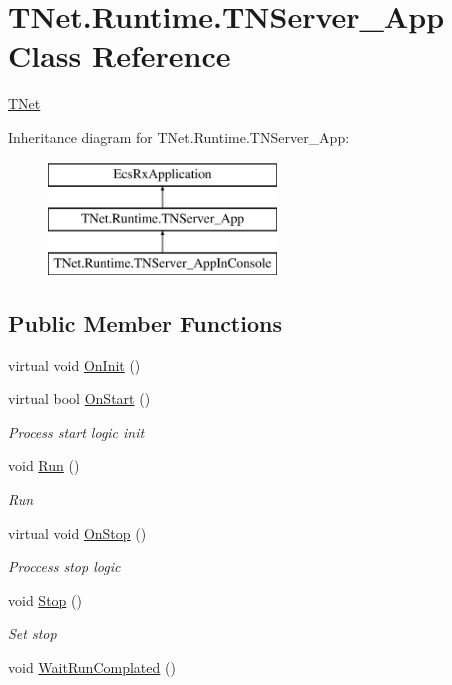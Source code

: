\hypertarget{class_t_net_1_1_runtime_1_1_t_n_server___app}{}\section{T\+Net.\+Runtime.\+T\+N\+Server\+\_\+\+App Class Reference}
\label{class_t_net_1_1_runtime_1_1_t_n_server___app}


\mbox{\hyperlink{namespace_t_net}{T\+Net}}  


Inheritance diagram for T\+Net.\+Runtime.\+T\+N\+Server\+\_\+\+App\+:\begin{figure}[H]
\begin{center}
\leavevmode
\includegraphics[height=3.000000cm]{class_t_net_1_1_runtime_1_1_t_n_server___app}
\end{center}
\end{figure}
\subsection*{Public Member Functions}
\begin{DoxyCompactItemize}
\item 
virtual void \mbox{\hyperlink{class_t_net_1_1_runtime_1_1_t_n_server___app_a0fbd0d2d3bc734612f9cf92cd51ad116}{On\+Init}} ()
\item 
virtual bool \mbox{\hyperlink{class_t_net_1_1_runtime_1_1_t_n_server___app_a34f62e59e7f00253b69892f55b369169}{On\+Start}} ()
\begin{DoxyCompactList}\small\item\em Process start logic init \end{DoxyCompactList}\item 
void \mbox{\hyperlink{class_t_net_1_1_runtime_1_1_t_n_server___app_a6420b942d9a6d0c433959fd81d205993}{Run}} ()
\begin{DoxyCompactList}\small\item\em Run \end{DoxyCompactList}\item 
virtual void \mbox{\hyperlink{class_t_net_1_1_runtime_1_1_t_n_server___app_a81c7d21a7e7760e7b57c32ddf986e1ed}{On\+Stop}} ()
\begin{DoxyCompactList}\small\item\em Proccess stop logic \end{DoxyCompactList}\item 
void \mbox{\hyperlink{class_t_net_1_1_runtime_1_1_t_n_server___app_a5132beddceb5f938fe1cff7be976347d}{Stop}} ()
\begin{DoxyCompactList}\small\item\em Set stop \end{DoxyCompactList}\item 
void \mbox{\hyperlink{class_t_net_1_1_runtime_1_1_t_n_server___app_a046b9344c8dc3cbd88e8e97c2d4d7bc6}{Wait\+Run\+Complated}} ()
\end{DoxyCompactItemize}
